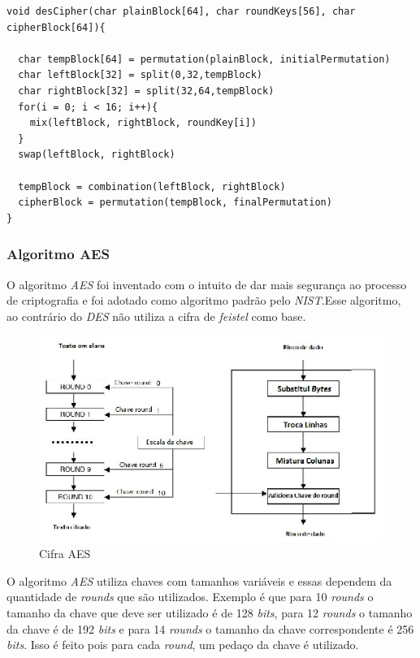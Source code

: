     \begin{lstlisting}[caption={Pseudo-código DES}, label=des-pseudo-code]
void desCipher(char plainBlock[64], char roundKeys[56], char cipherBlock[64]){

  char tempBlock[64] = permutation(plainBlock, initialPermutation)
  char leftBlock[32] = split(0,32,tempBlock)
  char rightBlock[32] = split(32,64,tempBlock)
  for(i = 0; i < 16; i++){
	mix(leftBlock, rightBlock, roundKey[i])    
  }
  swap(leftBlock, rightBlock)
  
  tempBlock = combination(leftBlock, rightBlock)
  cipherBlock = permutation(tempBlock, finalPermutation)
}
    \end{lstlisting}


\subsubsection{Algoritmo AES}

O algoritmo \textit{AES} foi inventado com o intuito de dar mais segurança ao processo de criptografia e foi adotado como algoritmo padrão pelo \textit{NIST}.Esse algoritmo, ao contrário do \textit{DES} não utiliza a cifra de \textit{feistel} como base. 

\begin{figure}[h]
	\centering
	\includegraphics[scale=2]
		{figuras/aes_cipher.eps}
		\caption[Cifra\textit{AES}]{Cifra AES\protect\footnotemark} 
		\label{cifra-aes}
\end{figure}


O algoritmo \textit{AES} utiliza chaves com tamanhos variáveis e essas dependem da quantidade de \textit{rounds} que são utilizados. Exemplo é que para 10 \textit{rounds} o tamanho da chave que deve ser utilizado é de 128 \textit{bits}, para 12 \textit{rounds} o tamanho da chave é de 192 \textit{bits} e para 14 \textit{rounds} o tamanho da chave correspondente é 256 \textit{bits}. Isso é feito pois para cada \textit{round}, um pedaço da chave é utilizado.

